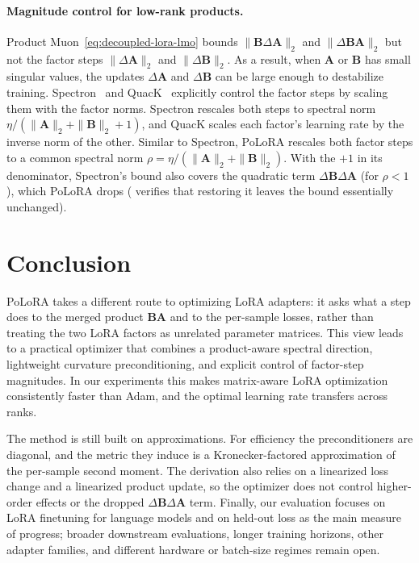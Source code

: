 \documentclass{article}
\newcommand{\mat}[1]{\bm{#1}}
\newcommand{\norm}[1]{\| #1\|}
\newcommand{\methodname}{PoLoRA\xspace}
\begin{document}
\paragraph{Magnitude control for low-rank products.}
Product Muon~\eqref{eq:decoupled-lora-lmo} bounds $\norm{\mat{B}\Delta\mat{A}}_2$ and $\norm{\Delta\mat{B} \mat{A}}_2$ but not the factor steps $\norm{\Delta\mat{A}}_2$ and $\norm{\Delta\mat{B}}_2$. As a result, when $\mat{A}$ or $\mat{B}$ has small singular values, the updates $\Delta\mat{A}$ and $\Delta\mat{B}$ can be large enough to destabilize training. Spectron~\cite{spectron} and QuacK~\cite{quack} explicitly control the factor steps by scaling them with the factor norms. Spectron rescales both steps to spectral norm $\eta/(\norm{\mat{A}}_2+\norm{\mat{B}}_2+1)$, and QuacK scales each factor's learning rate by the inverse norm of the other. Similar to Spectron, \methodname{} rescales both factor steps to a common spectral norm $\rho=\eta/(\norm{\mat{A}}_2+\norm{\mat{B}}_2)$. With the $+1$ in its denominator, Spectron's bound also covers the quadratic term $\Delta\mat{B} \Delta\mat{A}$ (for $\rho<1$), which \methodname{} drops ( verifies that restoring it leaves the bound essentially unchanged).


\section{Conclusion}
\label{sec:conclusion}

\methodname{} takes a different route to optimizing LoRA adapters: it asks what a step does to the merged product $\mat{B}\mat{A}$ and to the per-sample losses, rather than treating the two LoRA factors as unrelated parameter matrices. This view leads to a practical optimizer that combines a product-aware spectral direction, lightweight curvature preconditioning, and explicit control of factor-step magnitudes. In our experiments this makes matrix-aware LoRA optimization consistently faster than Adam, and the optimal learning rate transfers across ranks.

The method is still built on approximations. For efficiency the preconditioners are diagonal, and the metric they induce is a Kronecker-factored approximation of the per-sample second moment. The derivation also relies on a linearized loss change and a linearized product update, so the optimizer does not control higher-order effects or the dropped $\Delta\mat{B}\Delta\mat{A}$ term. Finally, our evaluation focuses on LoRA finetuning for language models and on held-out loss as the main measure of progress; broader downstream evaluations, longer training horizons, other adapter families, and different hardware or batch-size regimes remain open.
\end{document}
